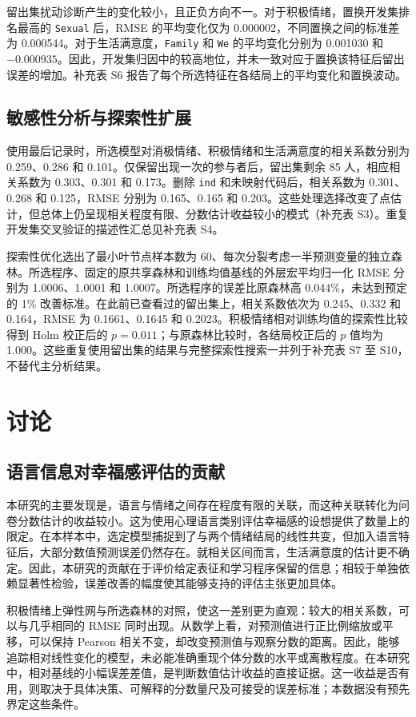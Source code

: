 

留出集扰动诊断产生的变化较小，且正负方向不一。对于积极情绪，置换开发集排名最高的 \texttt{Sexual} 后，RMSE 的平均变化仅为 0.000002，不同置换之间的标准差为 0.000544。对于生活满意度，\texttt{Family} 和 \texttt{We} 的平均变化分别为 0.001030 和 $-0.000935$。因此，开发集归因中的较高地位，并未一致对应于置换该特征后留出误差的增加。补充表 S6 报告了每个所选特征在各结局上的平均变化和置换波动。

\subsection{敏感性分析与探索性扩展}
使用最后记录时，所选模型对消极情绪、积极情绪和生活满意度的相关系数分别为 0.259、0.286 和 0.101。仅保留出现一次的参与者后，留出集剩余 85 人，相应相关系数为 0.303、0.301 和 0.173。删除 \texttt{ind} 和未映射代码后，相关系数为 0.301、0.268 和 0.125，RMSE 分别为 0.165、0.165 和 0.203。这些处理选择改变了点估计，但总体上仍呈现相关程度有限、分数估计收益较小的模式（补充表 S3）。重复开发集交叉验证的描述性汇总见补充表 S4。

探索性优化选出了最小叶节点样本数为 60、每次分裂考虑一半预测变量的独立森林。所选程序、固定的原共享森林和训练均值基线的外层宏平均归一化 RMSE 分别为 1.0006、1.0001 和 1.0007。所选程序的误差比原森林高 0.044\%，未达到预定的 1\% 改善标准。在此前已查看过的留出集上，相关系数依次为 0.245、0.332 和 0.164，RMSE 为 0.1661、0.1645 和 0.2023。积极情绪相对训练均值的探索性比较得到 Holm 校正后的 $p=0.011$；与原森林比较时，各结局校正后的 $p$ 值均为 1.000。这些重复使用留出集的结果与完整探索性搜索一并列于补充表 S7 至 S10，不替代主分析结果。

\section{讨论}
\subsection{语言信息对幸福感评估的贡献}
本研究的主要发现是，语言与情绪之间存在程度有限的关联，而这种关联转化为问卷分数估计的收益较小。这为使用心理语言类别评估幸福感的设想提供了数量上的限定。在本样本中，选定模型捕捉到了与两个情绪结局的线性共变，但加入语言特征后，大部分数值预测误差仍然存在。就相关区间而言，生活满意度的估计更不确定。因此，本研究的贡献在于评价给定表征和学习程序保留的信息；相较于单独依赖显著性检验，误差改善的幅度使其能够支持的评估主张更加具体。

积极情绪上弹性网与所选森林的对照，使这一差别更为直观：较大的相关系数，可以与几乎相同的 RMSE 同时出现。从数学上看，对预测值进行正比例缩放或平移，可以保持 Pearson 相关不变，却改变预测值与观察分数的距离。因此，能够追踪相对线性变化的模型，未必能准确重现个体分数的水平或离散程度。在本研究中，相对基线的小幅误差差值，是判断数值估计收益的直接证据。这一收益是否有用，则取决于具体决策、可解释的分数量尺及可接受的误差标准；本数据没有预先界定这些条件。

